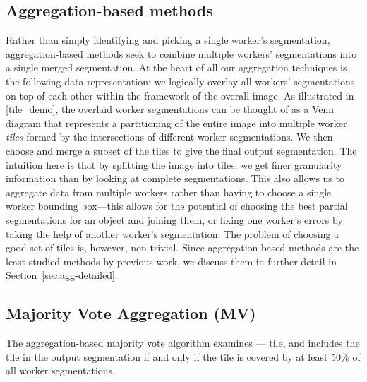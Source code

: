 \subsection{Aggregation-based methods}
Rather than simply identifying and picking a single worker's segmentation, aggregation-based methods seek to combine multiple workers' segmentations into a single merged segmentation. At the heart of all our aggregation techniques is the following data representation: we logically overlay all workers' segmentations on top of each other within the framework of the overall image. As illustrated in \ref{tile_demo}, the overlaid worker segmentations can be thought of as a Venn diagram that represents a partitioning of the entire image into multiple worker {\em tiles} formed by the intersections of different worker segmentations. We then choose and merge a subset of the tiles to give the final output segmentation. The intuition here is that by splitting the image into tiles, we get finer granularity information than by looking at complete segmentations. This also allows us to aggregate data from multiple workers rather than having to choose a single worker bounding box---this allows for the potential of choosing the best partial segmentations for an object and joining them, or fixing one worker's errors by taking the help of another worker's segmentation. The problem of choosing a good set of tiles is, however, non-trivial.
Since aggregation based methods are the least studied methods by previous work, we discuss them in further detail in Section~\ref{sec:agg-detailed}.


\subsection{Majority Vote Aggregation (MV)}
The aggregation-based majority vote algorithm examines --- tile, and includes the tile in the output segmentation if and only if the tile is covered by at least 50\% of all worker segmentations.

